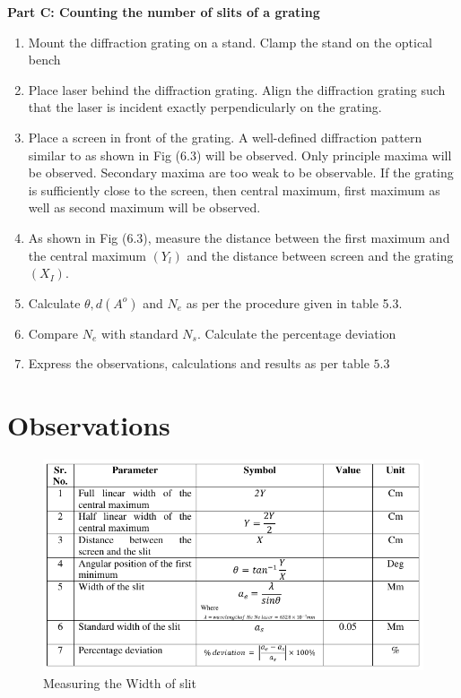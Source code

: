 \documentclass[11pt]{article}
\begin{document}
\noindent
\textbf{Part C: Counting the number of slits of a grating}
\begin{enumerate}

	\item Mount the diffraction grating on a stand. Clamp the stand on the optical bench
	\item Place laser behind the diffraction grating. Align the diffraction grating such that the laser is incident exactly perpendicularly on the grating.
	\item Place a screen in front of the grating. A well-defined diffraction pattern similar to as shown in Fig (6.3) will be observed. Only principle maxima will be observed. Secondary maxima are too weak to be observable. If the grating is sufficiently close to the screen, then central maximum, first maximum as well as second maximum will be observed.
	\item As shown in Fig (6.3), measure the distance between the first maximum and the central maximum $\left(Y_{l}\right)$ and the distance between screen and the grating $\left(X_{I}\right)$.
	\item Calculate $\theta, d\left(A^{o}\right)$ and $N_{e}$ as per the procedure given in table 5.3.
	\item Compare $N_{e}$ with standard $N_{s}$. Calculate the percentage deviation
	\item Express the observations, calculations and results as per table $5.3$

\end{enumerate}

\clearpage

\section{Observations}


\begin{figure}[H]
	\centering
	\includegraphics[scale=0.8]{widthofslit.png}
	\caption{Measuring the Width of slit}
	\label{it}
\end{figure}
\end{document}
